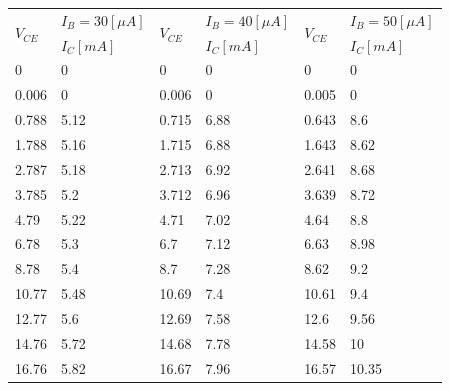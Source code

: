 \documentclass[10pt, a4j, dvipdfmx]{jarticle}
\begin{document}
    \begin{table}[H]
        \centering
        \begin{tabular}{|l|l||l|l||l|l|}
        \hline
        \multirow{2}{*}{$V_{CE}$} & $I_B=30[\mu A]$ & \multirow{2}{*}{$V_{CE}$} & $I_B=40[\mu A]$ & \multirow{2}{*}{$V_{CE}$} & $I_B=50[\mu A]$ \\ \cline{2-2} \cline{4-4} \cline{6-6} 
                                  & $I_C[mA]$       &                           & $I_C[mA]$       &                           & $I_C[mA]$       \\ \hline
        0                         & 0               & 0                         & 0               & 0                         & 0               \\ \hline
        0.006                     & 0               & 0.006                     & 0               & 0.005                     & 0               \\ \hline
        0.788                     & 5.12            & 0.715                     & 6.88            & 0.643                     & 8.6             \\ \hline
        1.788                     & 5.16            & 1.715                     & 6.88            & 1.643                     & 8.62            \\ \hline
        2.787                     & 5.18            & 2.713                     & 6.92            & 2.641                     & 8.68            \\ \hline
        3.785                     & 5.2             & 3.712                     & 6.96            & 3.639                     & 8.72            \\ \hline
        4.79                      & 5.22            & 4.71                      & 7.02            & 4.64                      & 8.8             \\ \hline
        6.78                      & 5.3             & 6.7                       & 7.12            & 6.63                      & 8.98            \\ \hline
        8.78                      & 5.4             & 8.7                       & 7.28            & 8.62                      & 9.2             \\ \hline
        10.77                     & 5.48            & 10.69                     & 7.4             & 10.61                     & 9.4             \\ \hline
        12.77                     & 5.6             & 12.69                     & 7.58            & 12.6                      & 9.56            \\ \hline
        14.76                     & 5.72            & 14.68                     & 7.78            & 14.58                     & 10              \\ \hline
        16.76                     & 5.82            & 16.67                     & 7.96            & 16.57                     & 10.35           \\ \hline
        \end{tabular}
    \end{table}
\end{document}
